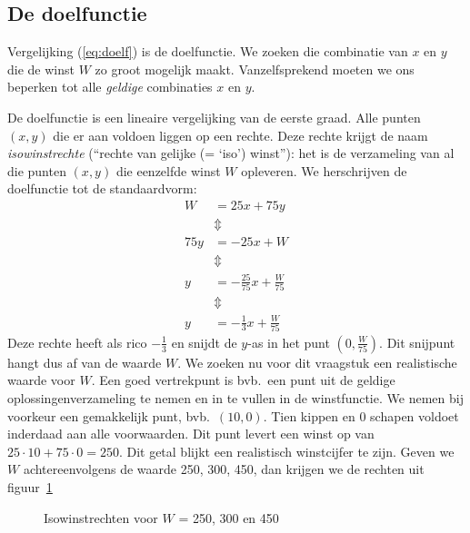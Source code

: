 \subsection{De doelfunctie}
Vergelijking (\ref{eq:doelf}) is de doelfunctie. We zoeken die combinatie
van $x$ en $y$ die de winst $W$ zo groot mogelijk maakt.
Vanzelfsprekend moeten we ons beperken tot alle \emph{geldige} combinaties $x$
en $y$.

De doelfunctie is een lineaire
vergelijking van de eerste graad. Alle punten $(x, y)$
die er aan voldoen liggen op een rechte. Deze rechte krijgt de
naam \emph{isowinstrechte} (``rechte van gelijke (= `iso') winst''):
het is de verzameling van al die punten $(x, y)$ die eenzelfde
winst $W$ opleveren. We herschrijven de doelfunctie tot de
standaardvorm:
\begin{align*}
    W &=  25x+75y  \\
     & \Updownarrow    \\
    75y &=  -25x+W  \\
     & \Updownarrow    \\
    y &=  -\frac{25}{75}x+\frac{W}{75}  \\
     & \Updownarrow    \\
    y &=  -\frac{1}{3}x+\frac{W}{75}
\end{align*}
Deze rechte heeft als rico $-\frac{1}{3}$ en snijdt de $y$-as in het punt
$(0,\frac{W}{75})$. Dit snijpunt hangt dus af van de waarde $W$.
We zoeken nu voor dit vraagstuk een realistische waarde voor
$W$. Een goed vertrekpunt is bvb.\ een punt uit de geldige oplossingenverzameling
te nemen en in te vullen in de winstfunctie. We nemen 	
bij voorkeur een gemakkelijk punt, bvb.\ $(10, 0)$. Tien kippen
en 0 schapen voldoet inderdaad aan alle voorwaarden. Dit punt
levert een winst op van $25\cdot 10 + 75\cdot 0 = 250$.
Dit getal blijkt een realistisch
winstcijfer te zijn. Geven we $W$ achtereenvolgens de waarde
250,  300, 450, dan krijgen we de rechten
uit figuur~\ref{fig:isowinstrechten}
\begin{figure}[htbp]
    \centering
{}
    \caption{Isowinstrechten voor $W$ = 250, 300 en 450}
    \label{fig:isowinstrechten}
\end{figure}


